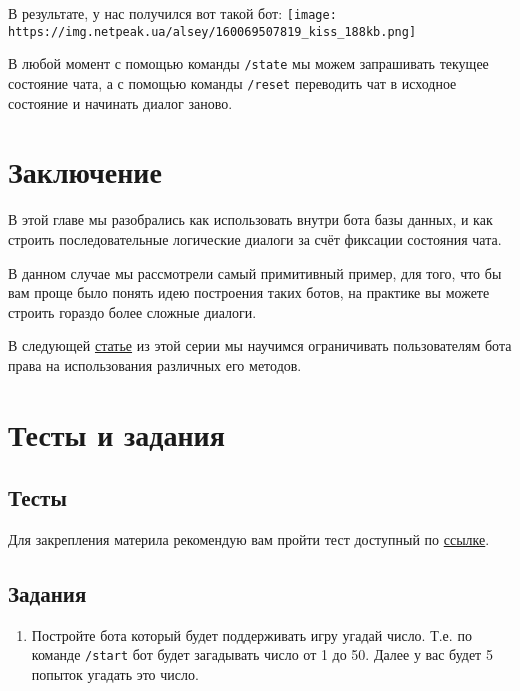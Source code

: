 \documentclass[
]{book}
\providecommand{\tightlist}{%
  \setlength{\itemsep}{0pt}\setlength{\parskip}{0pt}}
\begin{document}
В результате, у нас получился вот такой бот:
\texttt{[image: https://img.netpeak.ua/alsey/160069507819\_kiss\_188kb.png]}

В любой момент с помощью команды \texttt{/state} мы можем запрашивать текущее состояние чата, а с помощью команды \texttt{/reset} переводить чат в исходное состояние и начинать диалог заново.

\hypertarget{ux437ux430ux43aux43bux44eux447ux435ux43dux438ux435-3}{%
\section{Заключение}\label{ux437ux430ux43aux43bux44eux447ux435ux43dux438ux435-3}}

В этой главе мы разобрались как использовать внутри бота базы данных, и как строить последовательные логические диалоги за счёт фиксации состояния чата.

В данном случае мы рассмотрели самый примитивный пример, для того, что бы вам проще было понять идею построения таких ботов, на практике вы можете строить гораздо более сложные диалоги.

В следующей \href{https://habr.com/ru/post/520208/}{статье} из этой серии мы научимся ограничивать пользователям бота права на использования различных его методов.

\hypertarget{ux442ux435ux441ux442ux44b-ux438-ux437ux430ux434ux430ux43dux438ux44f-3}{%
\section{Тесты и задания}\label{ux442ux435ux441ux442ux44b-ux438-ux437ux430ux434ux430ux43dux438ux44f-3}}

\hypertarget{ux442ux435ux441ux442ux44b-3}{%
\subsection{Тесты}\label{ux442ux435ux441ux442ux44b-3}}

Для закрепления материла рекомендую вам пройти тест доступный по \href{https://onlinetestpad.com/t/build-tg-bot-in-r-4}{ссылке}.

\hypertarget{ux437ux430ux434ux430ux43dux438ux44f-3}{%
\subsection{Задания}\label{ux437ux430ux434ux430ux43dux438ux44f-3}}

\begin{enumerate}
\def\labelenumi{\arabic{enumi}.}
\tightlist
\item
  Постройте бота который будет поддерживать игру угадай число. Т.е. по команде \texttt{/start} бот будет загадывать число от 1 до 50. Далее у вас будет 5 попыток угадать это число.
\end{enumerate}
\end{document}
